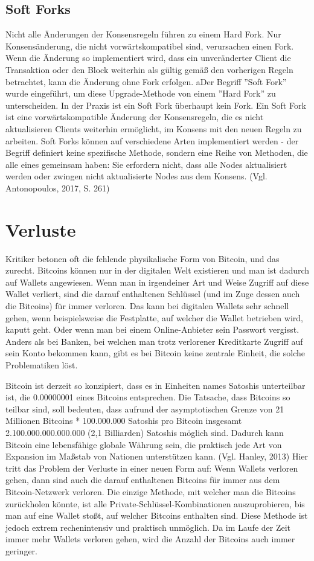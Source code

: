 \subsection{Soft Forks}
Nicht alle Änderungen der Konsensregeln führen zu einem Hard Fork. Nur Konsensänderung, die nicht vorwärtskompatibel sind,
verursachen einen Fork. Wenn die Änderung so implementiert wird, dass ein unveränderter Client die Transaktion oder den
Block weiterhin als gültig gemäß den vorherigen Regeln betrachtet, kann die Änderung ohne Fork erfolgen. aDer Begriff
''Soft Fork'' wurde eingeführt, um diese Upgrade-Methode von einem ''Hard Fork'' zu unterscheiden. In der Praxis ist ein Soft
Fork überhaupt kein Fork. Ein Soft Fork ist eine vorwärtskompatible Änderung der Konsensregeln, die es nicht aktualisieren
Clients weiterhin ermöglicht, im Konsens mit den neuen Regeln zu arbeiten. Soft Forks können auf verschiedene Arten implementiert
werden - der Begriff definiert keine spezifische Methode, sondern eine Reihe von Methoden, die alle eines gemeinsam haben: Sie
erfordern nicht, dass alle Nodes aktualisiert werden oder zwingen nicht aktualisierte Nodes aus dem Konsens. (Vgl. Antonopoulos,
2017, S. 261)

\section{Verluste}
Kritiker betonen oft die fehlende physikalische Form von Bitcoin, und das zurecht. Bitcoins können nur in der digitalen Welt
existieren und man ist dadurch auf Wallets angewiesen. Wenn man in irgendeiner Art und Weise Zugriff auf diese Wallet verliert,
sind die darauf enthaltenen Schlüssel (und im Zuge dessen auch die Bitcoins) für immer verloren. Das kann bei digitalen Wallets 
sehr schnell gehen, wenn beispielsweise
die Festplatte, auf welcher die Wallet betrieben wird, kaputt geht. Oder wenn man bei einem Online-Anbieter sein Passwort
vergisst. Anders als bei Banken, bei welchen man trotz verlorener Kreditkarte Zugriff auf sein Konto bekommen kann, gibt es 
bei Bitcoin keine zentrale Einheit, die solche Problematiken löst.

Bitcoin ist derzeit so konzipiert, dass es in Einheiten names Satoshis unterteilbar ist, die 0.00000001 eines Bitcoins
entsprechen. Die Tatsache, dass Bitcoins so teilbar sind, soll bedeuten, dass aufrund der asymptotischen Grenze von 21
Millionen Bitcoins * 100.000.000 Satoshis pro Bitcoin insgesamt 2.100.000.000.000.000 (2,1 Billiarden) Satoshis möglich sind.
Dadurch kann Bitcoin eine lebensfähige globale Währung sein, die praktisch jede Art von Expansion im Maßstab von Nationen 
unterstützen kann. (Vgl. Hanley, 2013)
Hier tritt das Problem der Verluste in einer neuen Form auf: Wenn Wallets verloren gehen, dann sind auch die 
darauf enthaltenen Bitcoins für immer aus dem Bitcoin-Netzwerk verloren. Die einzige Methode, mit welcher man die Bitcoins
zurückholen könnte, ist alle Private-Schlüssel-Kombinationen auszuprobieren, bis man auf eine Wallet stoßt, auf welcher Bitcoins
enthalten sind. Diese Methode ist jedoch extrem rechenintensiv und praktisch unmöglich. Da im Laufe der Zeit immer mehr Wallets
verloren gehen, wird die Anzahl der Bitcoins auch immer geringer.